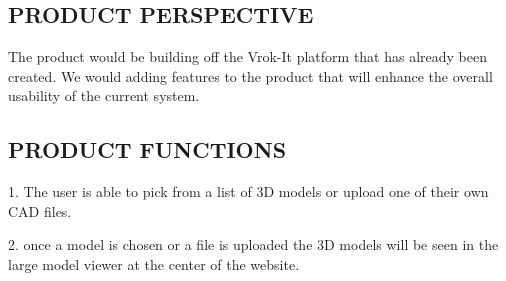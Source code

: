 \documentclass[letterpaper, 10pt, draftclsnofoot, onecolumn]{IEEEtran}
\begin{document}
\subsection[PRODUCT
PERSPECTIVE]{\rmfamily\bfseries\color{black}
PRODUCT PERSPECTIVE}
{\color{black}
\begin{comment}

\foreignlanguage{english}{\textit{This subsection of the document should
put the product into perspective with other related products. \ If the
product \ is independent and totally self-contained, it should be so
stated here. If the document de[FB01?]nes a product that is a component
of a larger system, then this subsection should relate the requirements
of \ that larger system to functionality of the software and should
identify interfaces between that system and the software. \ A block
diagram showing the major components of the larger system,
interconnections, and external interfaces can be
helpful.}}\foreignlanguage{english}{\textbf{\textit{ }}}}
\end{comment}
{\color{black}
The product would be building off the Vrok-It platform that has already been created. We would adding features to the product that will enhance the overall usability of the current system.    }

\subsection[PRODUCT
FUNCTIONS]{\rmfamily\bfseries\color{black}
PRODUCT FUNCTIONS}
\begin{comment}

{\selectlanguage{english}\itshape\color{black}
This subsection of the document should provide a summary of the major
functions that the software will perform. \ For the sake of clarity The
functions should be organized in a way that makes the list of functions
understandable to the \ customer or to anyone else reading the document
for the first time. \ Textual or graphical methods can be used to show
the different functions and their relationships. \ Such a diagram is
not intended to show a design of a product, but simply shows the
logical relationships among variables.}
\end{comment}
{\color{black}
1.	The user is able to pick from a list of 3D models or upload one of their own CAD files.

2.	once a model is chosen or a file is uploaded the 3D models will be seen in the large model viewer at the 
	center of the website.

}}
\end{document}
